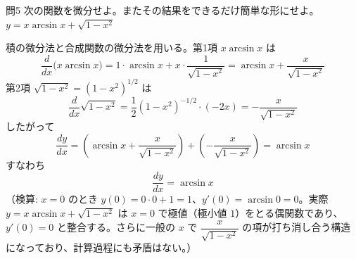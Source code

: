 \documentclass[a4paper,11pt]{article}
\begin{document}
\clearpage
\begin{mondaiboxS}{問5}
次の関数を微分せよ。またその結果をできるだけ簡単な形にせよ。 $y = x\arcsin x + \sqrt{1-x^{2}}$
\end{mondaiboxS}
\kaitou
積の微分法と合成関数の微分法を用いる。第1項 $x\arcsin x$ は
\[
\frac{d}{dx}\bigl(x\arcsin x\bigr) = 1\cdot \arcsin x + x\cdot \frac{1}{\sqrt{1-x^{2}}}
= \arcsin x + \frac{x}{\sqrt{1-x^{2}}}
\]
第2項 $\sqrt{1-x^{2}} = (1-x^{2})^{1/2}$ は
\[
\frac{d}{dx}\sqrt{1-x^{2}} = \frac{1}{2}(1-x^{2})^{-1/2}\cdot(-2x) = -\frac{x}{\sqrt{1-x^{2}}}
\]
したがって
\[
\frac{dy}{dx} = \left(\arcsin x + \frac{x}{\sqrt{1-x^{2}}}\right) + \left(-\frac{x}{\sqrt{1-x^{2}}}\right) = \arcsin x
\]
すなわち
\[
\boxed{\; \frac{dy}{dx} = \arcsin x \;}
\]
（検算: $x=0$ のとき $y(0) = 0\cdot 0 + 1 = 1$、$y'(0) = \arcsin 0 = 0$。実際 $y=x\arcsin x+\sqrt{1-x^{2}}$ は $x=0$ で極値（極小値 $1$）をとる偶関数であり、$y'(0)=0$ と整合する。さらに一般の $x$ で $\dfrac{x}{\sqrt{1-x^2}}$ の項が打ち消し合う構造になっており、計算過程にも矛盾はない。）
\end{document}
